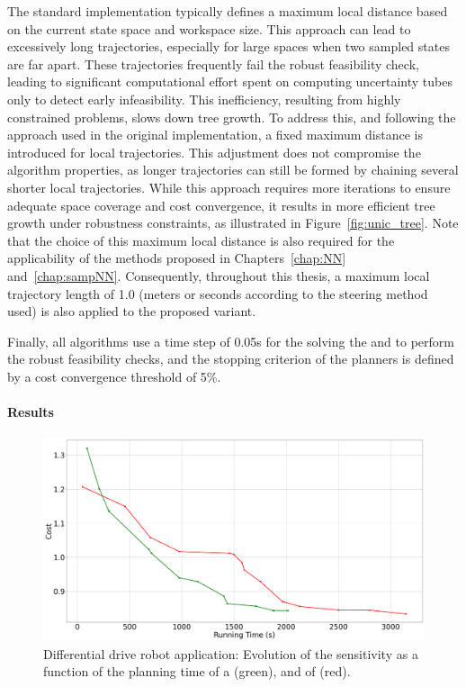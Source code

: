 The standard   implementation typically defines a maximum local distance based on the current state space and workspace size.
This approach can lead to excessively long trajectories, especially for large spaces when two sampled states are far apart.
These trajectories frequently fail the robust feasibility check, leading to significant computational effort spent on computing uncertainty tubes only to detect early infeasibility. 
This inefficiency, resulting from highly constrained problems, slows down tree growth.
To address this, and following the approach used in the original  implementation, a fixed maximum distance is introduced for local trajectories. 
This adjustment does not compromise the algorithm properties, as longer trajectories can still be formed by chaining several shorter local trajectories. 
While this approach requires more iterations to ensure adequate space coverage and cost convergence, it results in more efficient tree growth under robustness constraints, as illustrated in Figure~\ref{fig:unic_tree}.
Note that the choice of this maximum local distance is also required for the applicability of the methods proposed in Chapters~\ref{chap:NN} and~\ref{chap:sampNN}.
Consequently, throughout this thesis, a maximum local trajectory length of 1.0 (meters or seconds according to the steering method used) is also applied to the proposed  variant.

Finally, all algorithms use a time step of 0.05s for the solving the  and to perform the robust feasibility checks, and the stopping criterion of the planners is defined by a cost convergence threshold of 5\%.

\paragraph{Results}



\begin{figure} [h!]
    \centering
    \includegraphics[width=0.6\linewidth]{figures/samp/unicycle_cost_conv.png} 
    \caption{Differential drive robot application: Evolution of the sensitivity as a function of the planning time of a  (green), and of  (red).}%
    \label{fig:samp_unic_time}%
\end{figure}

